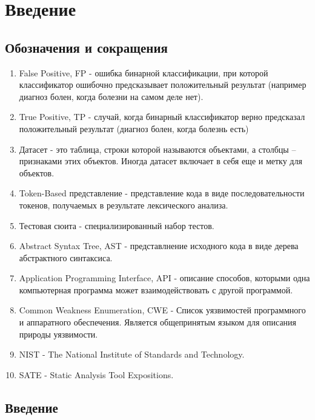 \section{Введение}
\label{sec:Chapter0} 

\subsection{Обозначения и сокращения}

\begin{enumerate}
    \item False Positive, FP - ошибка бинарной классификации, при которой классификатор ошибочно предсказывает положительный результат (например диагноз болен, когда болезни на самом деле нет).
    \item True Positive, TP - случай, когда бинарный классификатор верно предсказал положительный результат (диагноз болен, когда болезнь есть)
    \item Датасет - это таблица, строки которой называются объектами, а столбцы – признаками этих объектов. Иногда датасет включает в себя еще и метку для объектов.
    \item Token-Based представление - представление кода в виде последовательности токенов, получаемых в результате лексического анализа.
    \item Тестовая сюита - специализированный набор тестов.
    \item Abstract Syntax Tree, AST - представлнение исходного кода в виде дерева абстрактного синтаксиса.
    \item Application Programming Interface, API - описание способов, которыми одна компьютерная программа может взаимодействовать с другой программой.
    \item Common Weakness Enumeration, CWE \cite{CWE-doc} - Список уязвимостей программного и аппаратного обеспечения. Является общепринятым языком для описания природы уязвимости.
    \item NIST - The National Institute of Standards and Technology.
    \item SATE - Static Analysis Tool Expositions.
\end{enumerate}

\subsection{Введение}


